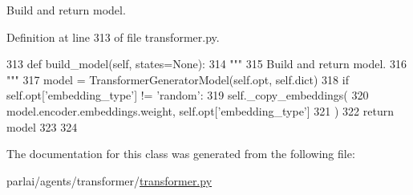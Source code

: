 \begin{DoxyVerb}Build and return model.
\end{DoxyVerb}
 

Definition at line 313 of file transformer.\+py.


\begin{DoxyCode}
313     \textcolor{keyword}{def }build\_model(self, states=None):
314         \textcolor{stringliteral}{"""}
315 \textcolor{stringliteral}{        Build and return model.}
316 \textcolor{stringliteral}{        """}
317         model = TransformerGeneratorModel(self.opt, self.dict)
318         \textcolor{keywordflow}{if} self.opt[\textcolor{stringliteral}{'embedding\_type'}] != \textcolor{stringliteral}{'random'}:
319             self.\_copy\_embeddings(
320                 model.encoder.embeddings.weight, self.opt[\textcolor{stringliteral}{'embedding\_type'}]
321             )
322         \textcolor{keywordflow}{return} model
323 
324 
\end{DoxyCode}


The documentation for this class was generated from the following file\+:\begin{DoxyCompactItemize}
\item 
parlai/agents/transformer/\hyperlink{transformer_8py}{transformer.\+py}\end{DoxyCompactItemize}
